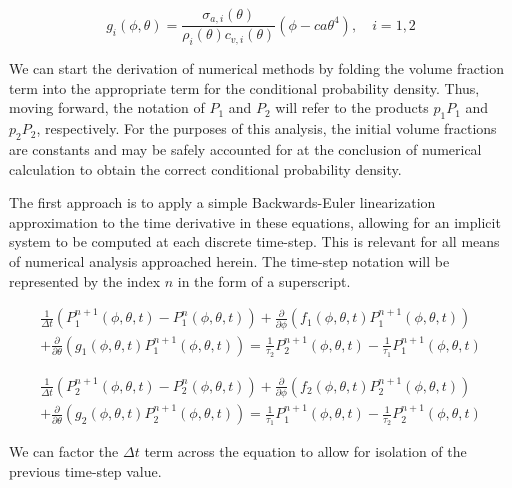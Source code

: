 \documentclass[12pt,a4paper,pagesize=pdftex]{scrartcl}
\begin{document}
\begin{equation*}
    g_i\left(\phi, \theta\right) = \frac{\sigma_{a,i}\left(\theta\right)}{\rho_i\left(\theta\right)c_{v,i}\left(\theta\right)}\left(\phi - c a \theta^4\right), \quad i = 1, 2
\end{equation*}

We can start the derivation of numerical methods by folding the volume fraction term into the appropriate term for the conditional probability density. Thus, moving forward, the notation of \(P_1\) and \(P_2\) will refer to the products \(p_1 P_1\) and \(p_2 P_2\), respectively. For the purposes of this analysis, the initial volume fractions are constants and may be safely accounted for at the conclusion of numerical calculation to obtain the correct conditional probability density.

The first approach is to apply a simple Backwards-Euler linearization approximation to the time derivative in these equations, allowing for an implicit system to be computed at each discrete time-step. This is relevant for all means of numerical analysis approached herein. The time-step notation will be represented by the index \(n\) in the form of a superscript.

\begin{multline*}
    \frac{1}{\Delta t} \left(P^{n+1}_1\left(\phi, \theta, t\right) - P^n_1\left(\phi, \theta, t\right)\right) + \frac{\partial}{\partial \phi} \left(f_1\left(\phi, \theta, t\right) P_1^{n+1} \left(\phi, \theta, t\right) \right) \\+ \frac{\partial}{\partial \theta} \left(g_1 \left(\phi, \theta, t\right) P_1^{n+1} \left(\phi, \theta, t\right)\right) = \frac{1}{\tau_2} P_2^{n+1}\left(\phi, \theta, t\right) - \frac{1}{\tau_1}P_1^{n+1}\left(\phi, \theta, t\right)
\end{multline*}

\begin{multline*}
    \frac{1}{\Delta t} \left(P^{n+1}_2\left(\phi, \theta, t\right) - P^n_2\left(\phi, \theta, t\right)\right) + \frac{\partial}{\partial \phi} \left(f_2\left(\phi, \theta, t\right) P_2^{n+1} \left(\phi, \theta, t\right) \right) \\+ \frac{\partial}{\partial \theta} \left(g_2 \left(\phi, \theta, t\right) P_2^{n+1} \left(\phi, \theta, t\right)\right) = \frac{1}{\tau_1} P_1^{n+1}\left(\phi, \theta, t\right) - \frac{1}{\tau_2}P_2^{n+1}\left(\phi, \theta, t\right)
\end{multline*}

We can factor the \(\Delta t\) term across the equation to allow for isolation of the previous time-step value.
\end{document}
